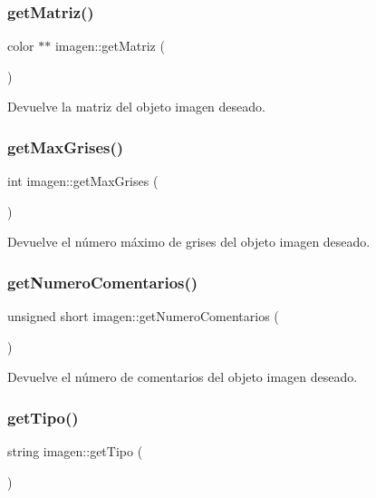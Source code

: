\subsubsection{\texorpdfstring{get\+Matriz()}{getMatriz()}}
{\footnotesize\ttfamily color $\ast$$\ast$ imagen\+::get\+Matriz (\begin{DoxyParamCaption}{ }\end{DoxyParamCaption})}

Devuelve la matriz del objeto imagen deseado. \mbox{\label{classimagen_a89ffc85c3f945b94edc202afac6bf315}} 
\subsubsection{\texorpdfstring{get\+Max\+Grises()}{getMaxGrises()}}
{\footnotesize\ttfamily int imagen\+::get\+Max\+Grises (\begin{DoxyParamCaption}{ }\end{DoxyParamCaption})}

Devuelve el número máximo de grises del objeto imagen deseado. \mbox{\label{classimagen_a47971a2dd948cd32e913a0744e24ae9f}} 
\subsubsection{\texorpdfstring{get\+Numero\+Comentarios()}{getNumeroComentarios()}}
{\footnotesize\ttfamily unsigned short imagen\+::get\+Numero\+Comentarios (\begin{DoxyParamCaption}{ }\end{DoxyParamCaption})}

Devuelve el número de comentarios del objeto imagen deseado. \mbox{\label{classimagen_aef9dea6dc4d170ecc535edb48159113d}} 
\subsubsection{\texorpdfstring{get\+Tipo()}{getTipo()}}
{\footnotesize\ttfamily string imagen\+::get\+Tipo (\begin{DoxyParamCaption}{ }\end{DoxyParamCaption})}


